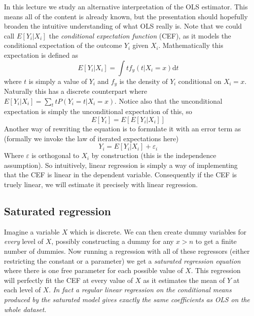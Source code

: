 In this lecture we study an alternative interpretation of the OLS estimator. This means all of the content is already known, but the presentation should hopefully broaden the intuitive understanding of what OLS really is. Note that we could call $E[Y_i|X_i]$ the \textit{conditional expectation function} (CEF), as it models the conditional expectation of the outcome $Y_i$ given $X_i$. Mathematically this expectation is defined as
\begin{equation}
E[Y_i|X_i] = \int t f_y(t|X_i = x) \textrm{d} t
\end{equation}
where $t$ is simply a value of $Y_i$ and $f_y$ is the density of $Y_i$ conditional on $X_i = x$. Naturally this has a discrete counterpart where $E[Y_i |X_i] = \sum_t t P(Y_i = t|X_i = x)$. Notice also that the unconditional expectation is simply the unconditional expectation of this, so
\begin{equation}
E[Y_i] = E[E[Y_i|X_i]]
\end{equation}
Another way of rewriting the equation is to formulate it with an error term as (formally we invoke the law of iterated expectations here)
\begin{equation}
Y_i = E[Y_i|X_i] + \varepsilon_i
\end{equation}
Where $\varepsilon$ is orthogonal to $X_i$ by construction (this is the independence assumption). So intuitively, linear regression is simply a way of implementing that the CEF is linear in the dependent variable. Consequently if the CEF is truely linear, we will estimate it precisely with linear regression.

\subsection{Saturated regression}
Imagine a variable $X$ which is discrete. We can then create dummy variables for \textit{every} level of $X$, possibly constructing a dummy for any $x>n$ to get a finite number of dummies. Now running a regression with all of these regressors (either restricting the constant or a parameter) we get a \textit{saturated regression equation} where there is one free parameter for each possible value of $X$. This regression will perfectly fit the CEF at every value of $X$ as it estimates the mean of $Y$ at each level of $X$. \textit{In fact a regular linear regression on the conditional means produced by the saturated model gives exactly the same coefficients as OLS on the whole dataset.}
